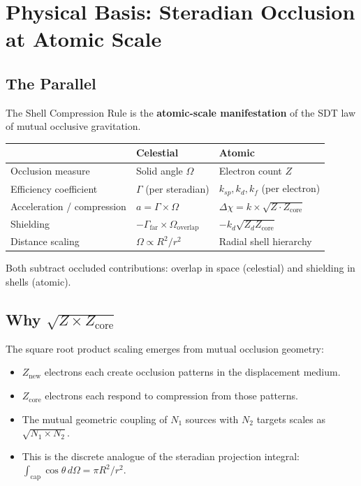 \section{Physical Basis: Steradian Occlusion at Atomic Scale}

\subsection{The Parallel}

The Shell Compression Rule is the \textbf{atomic-scale manifestation} of the SDT law of mutual occlusive gravitation.

\begin{center}
\begin{tabular}{lll}
\hline
& \textbf{Celestial} & \textbf{Atomic} \\
\hline
Occlusion measure & Solid angle $\Omega$ & Electron count $Z$ \\
Efficiency coefficient & $\Gamma$ (per steradian) & $k_{sp}, k_d, k_f$ (per electron) \\
Acceleration / compression & $a = \Gamma \times \Omega$ & $\Delta\chi = k \times \sqrt{Z \cdot Z_{\text{core}}}$ \\
Shielding & $-\Gamma_{\text{far}} \times \Omega_{\text{overlap}}$ & $-k_d\sqrt{Z_d Z_{\text{core}}}$ \\
Distance scaling & $\Omega \propto R^2/r^2$ & Radial shell hierarchy \\
\hline
\end{tabular}
\end{center}

Both subtract occluded contributions: overlap in space (celestial) and shielding in shells (atomic).

\subsection{Why $\sqrt{Z \times Z_{\text{core}}}$}

The square root product scaling emerges from mutual occlusion geometry:

\begin{itemize}
  \item $Z_{\text{new}}$ electrons each create occlusion patterns in the displacement medium.
  \item $Z_{\text{core}}$ electrons each respond to compression from those patterns.
  \item The mutual geometric coupling of $N_1$ sources with $N_2$ targets scales as $\sqrt{N_1 \times N_2}$.
  \item This is the discrete analogue of the steradian projection integral: $\int_{\text{cap}} \cos\theta\,d\Omega = \pi R^2/r^2$.
\end{itemize}

